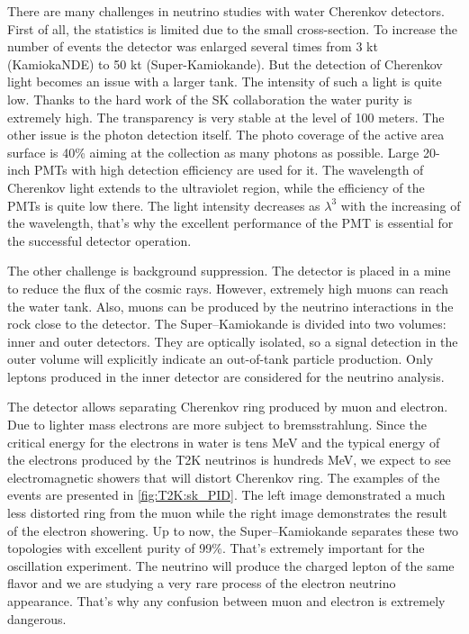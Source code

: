 \documentclass[../main.tex]{subfiles}
\begin{document}
There are many challenges in neutrino studies with water Cherenkov detectors. First of all, the statistics is limited due to the small cross-section. To increase the number of events the detector was enlarged several times from 3 kt (KamiokaNDE) to 50 kt (Super-Kamiokande). But the detection of Cherenkov light becomes an issue with a larger tank. The intensity of such a light is quite low. Thanks to the hard work of the SK collaboration the water purity is extremely high. The transparency is very stable at the level of 100 meters. The other issue is the photon detection itself. The photo coverage of the active area surface is 40\% aiming at the collection as many photons as possible. Large 20-inch PMTs with high detection efficiency are used for it. The wavelength of Cherenkov light extends to the ultraviolet region, while the efficiency of the PMTs is quite low there. The light intensity decreases as $\lambda^3$ with the increasing of the wavelength, that's why the excellent performance of the PMT is essential for the successful detector operation.

The other challenge is background suppression. The detector is placed in a mine to reduce the flux of the cosmic rays. However, extremely high muons can reach the water tank. Also, muons can be produced by the neutrino interactions in the rock close to the detector. The Super--Kamiokande is divided into two volumes: inner and outer detectors. They are optically isolated, so a signal detection in the outer volume will explicitly indicate an out-of-tank particle production. Only leptons produced in the inner detector are considered for the neutrino analysis.

The detector allows separating Cherenkov ring produced by muon and electron. Due to lighter mass electrons are more subject to bremsstrahlung. Since the critical energy for the electrons in water is tens MeV and the typical energy of the electrons produced by the T2K neutrinos is hundreds MeV, we expect to see electromagnetic showers that will distort Cherenkov ring. The examples of the events are presented in \autoref{fig:T2K:sk_PID}. The left image demonstrated a much less distorted ring from the muon while the right image demonstrates the result of the electron showering. Up to now, the Super--Kamiokande separates these two topologies with excellent purity of 99\%. That's extremely important for the oscillation experiment. The neutrino will produce the charged lepton of the same flavor and we are studying a very rare process of the electron neutrino appearance. That's why any confusion between muon and electron is extremely dangerous.
\end{document}

